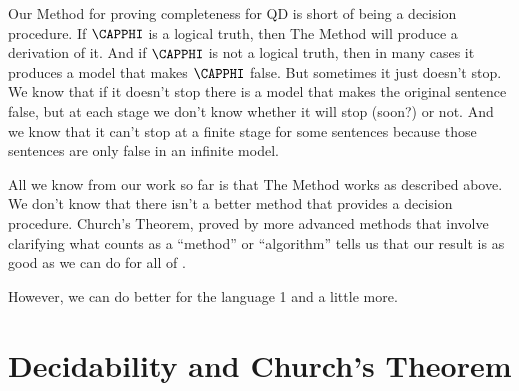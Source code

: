 Our Method for proving completeness for QD is short of being a decision procedure.  If $\CAPPHI$ is a logical truth, then The Method will produce a derivation of it.  And if $\CAPPHI$ is not a logical truth, then in many cases it produces a model that makes $\CAPPHI$ false.  But sometimes it just doesn't stop.  We know that if it doesn't stop there is a model that makes the original sentence false, but at each stage we don't know whether it will stop (soon?) or not.   And we know that it can't stop at a finite stage for some sentences because those sentences are only false in an infinite model.

All we know from our work so far is that The Method works as described above. We don't know that there isn't a better method that provides a decision procedure.  Church's Theorem, proved by more advanced methods that involve clarifying what counts as a ``method'' or ``algorithm'' tells us that our result is as good as we can do for all of \GQL{}.

However, we can do better for the language \GQL{}1 and a little more.

\section{Decidability and Church's Theorem}\label{Decidability and Churchs Theorem}

